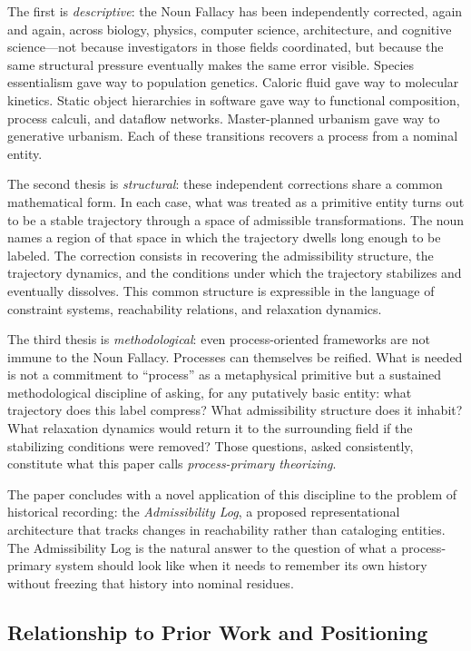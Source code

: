 \documentclass[12pt, a4paper]{article}
\theoremstyle{plain}
\theoremstyle{definition}
\theoremstyle{remark}
\begin{document}
The first is \emph{descriptive}: the Noun Fallacy has been independently
corrected, again and again, across biology, physics, computer science,
architecture, and cognitive science---not because investigators in those
fields coordinated, but because the same structural pressure eventually makes
the same error visible. Species essentialism gave way to population genetics.
Caloric fluid gave way to molecular kinetics. Static object hierarchies in
software gave way to functional composition, process calculi, and dataflow
networks. Master-planned urbanism gave way to generative urbanism.
Each of these transitions recovers a process from a nominal entity.

The second thesis is \emph{structural}: these independent corrections share
a common mathematical form. In each case, what was treated as a primitive
entity turns out to be a stable trajectory through a space of admissible
transformations. The noun names a region of that space in which the trajectory
dwells long enough to be labeled. The correction consists in recovering the
admissibility structure, the trajectory dynamics, and the conditions under
which the trajectory stabilizes and eventually dissolves. This common structure
is expressible in the language of constraint systems, reachability relations,
and relaxation dynamics.

The third thesis is \emph{methodological}: even process-oriented frameworks
are not immune to the Noun Fallacy. Processes can themselves be reified.
What is needed is not a commitment to ``process'' as a metaphysical primitive
but a sustained methodological discipline of asking, for any putatively basic
entity: what trajectory does this label compress? What admissibility structure
does it inhabit? What relaxation dynamics would return it to the surrounding
field if the stabilizing conditions were removed? Those questions, asked
consistently, constitute what this paper calls \emph{process-primary theorizing}.

The paper concludes with a novel application of this discipline to the
problem of historical recording: the \emph{Admissibility Log}, a proposed
representational architecture that tracks changes in reachability rather than
cataloging entities. The Admissibility Log is the natural answer to the
question of what a process-primary system should look like when it needs to
remember its own history without freezing that history into nominal residues.

\subsection{Relationship to Prior Work and Positioning}
\end{document}
